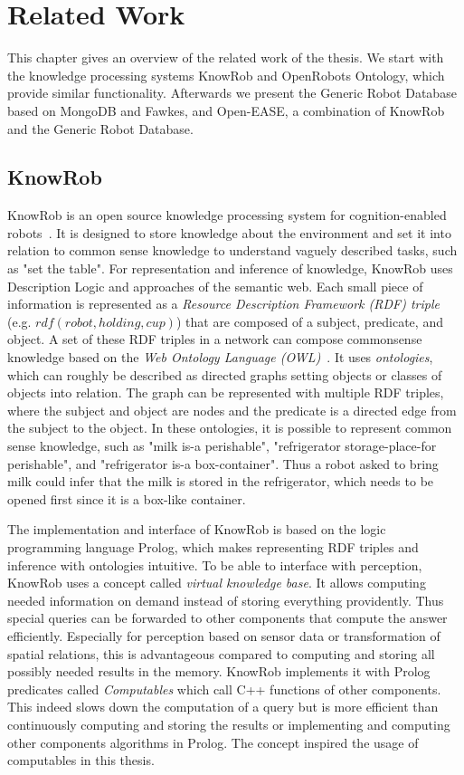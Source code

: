 \chapter{Related Work}
\label{chap:related}
This chapter gives an overview of the related work of the thesis. We
start with the knowledge processing systems KnowRob and OpenRobots
Ontology, which provide similar functionality. Afterwards we present
the Generic Robot Database based on MongoDB and Fawkes, and Open-EASE,
a combination of KnowRob and the Generic Robot Database.

\section{KnowRob}
\label{sec:knowrob}
KnowRob is an open source knowledge processing system for
cognition-enabled robots~\cite{KnowRob,KnowRob-Representation}. It is
designed to store knowledge about the environment and set it into
relation to common sense knowledge to understand vaguely described
tasks, such as "set the table". For representation and inference of
knowledge, KnowRob uses Description Logic and approaches of the
semantic web.  Each small piece of information is represented as a
\emph{Resource Description Framework (RDF) triple} (e.g. $rdf(robot,
holding, cup)$) that are composed of a subject, predicate, and
object. A set of these RDF triples in a network can compose
commonsense knowledge based on the \emph{Web Ontology Language
  (OWL)}~\cite{owl}. It uses \emph{ontologies}, which can roughly be described as
directed graphs setting objects or classes of objects into
relation. The graph can be represented with multiple RDF triples,
where the subject and object are nodes and the predicate is a directed
edge from the subject to the object. In these ontologies, it is
possible to represent common sense knowledge, such as "milk is-a
perishable", "refrigerator storage-place-for perishable", and
"refrigerator is-a box-container". Thus a robot asked to bring milk
could infer that the milk is stored in the refrigerator, which needs
to be opened first since it is a box-like container.

The implementation and interface of KnowRob is based on the logic
programming language Prolog, which makes representing RDF triples and
inference with ontologies intuitive.  To be able to interface with
perception, KnowRob uses a concept called \emph{virtual knowledge
  base}. It allows computing needed information on demand instead of
storing everything providently. Thus special queries can be forwarded
to other components that compute the answer efficiently.  Especially
for perception based on sensor data or transformation of spatial
relations, this is advantageous compared to computing and storing all
possibly needed results in the memory.  KnowRob implements it with
Prolog predicates called \emph{Computables} which call C++ functions
of other components. This indeed slows down the computation of a query
but is more efficient than continuously computing and storing the
results or implementing and computing other components algorithms in
Prolog.  The concept inspired the usage of computables in this thesis.

